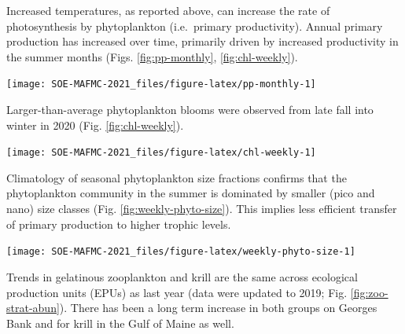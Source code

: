 \documentclass[
  10pt,
]{article}
\let\origfigure\figure
\let\endorigfigure\endfigure
\renewenvironment{figure}[1][2] {
    \expandafter\origfigure\expandafter[H]
} {
    \endorigfigure
}
\begin{document}
Increased temperatures, as reported above, can increase the rate of
photosynthesis by phytoplankton (i.e.~primary productivity). Annual
primary production has increased over time, primarily driven by
increased productivity in the summer months (Figs. \ref{fig:pp-monthly},
\ref{fig:chl-weekly}).

\begin{figure}

{\centering \texttt{[image: SOE-MAFMC-2021\_files/figure-latex/pp-monthly-1]} 

}

\caption{Monthly primary production trends show the annual cycle (i.e. the peak during the summer months) and the changes over time for each month.}\label{fig:pp-monthly}
\end{figure}

Larger-than-average phytoplankton blooms were observed from late fall
into winter in 2020 (Fig. \ref{fig:chl-weekly}).

\begin{figure}

{\centering \texttt{[image: SOE-MAFMC-2021\_files/figure-latex/chl-weekly-1]} 

}

\caption{Weekly chlorophyll concentrations and primary productivity in the Mid-Atlantic are shown for by the colored line for 2020 (dashed portion indicates preliminary data from a new satellite source). The long-term mean is shown in black and shading indicates +/- 1 sample SD.}\label{fig:chl-weekly}
\end{figure}

Climatology of seasonal phytoplankton size fractions confirms that the
phytoplankton community in the summer is dominated by smaller (pico and
nano) size classes (Fig. \ref{fig:weekly-phyto-size}). This implies less
efficient transfer of primary production to higher trophic levels.

\begin{figure}

{\centering \texttt{[image: SOE-MAFMC-2021\_files/figure-latex/weekly-phyto-size-1]} 

}

\caption{The annual climatology (1998-2019) percent composition of the phytoplankton size classes in the Mid-Atlantic bight based on satellite observations.}\label{fig:weekly-phyto-size}
\end{figure}

Trends in gelatinous zooplankton and krill are the same across
ecological production units (EPUs) as last year (data were updated to
2019; Fig. \ref{fig:zoo-strat-abun}). There has been a long term
increase in both groups on Georges Bank and for krill in the Gulf of
Maine as well.
\end{document}
